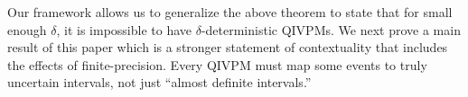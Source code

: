 \documentclass[english,reprint, aps, prl,superscriptaddress, showpacs,
showkeys, longbibliography, amsmath, amssymb, floatfix]{revtex4-1}
\theoremstyle{plain}
\theoremstyle{definition}
\newcommand{\events}{\ensuremath{\mathcal{E}}}
\newcommand{\proj}[1]{\op{#1}{#1}}
\newcommand{\yutsung}[1]{\begin{framed}\begin{minipage}{0.9\linewidth}\color{purple}{Yu-Tsung says: #1}\end{minipage}\end{framed}}
\newcommand{\andy}[1]{\fbox{\begin{minipage}{0.9\linewidth}\color{blue}{Andy says: #1}\end{minipage}}}
\begin{document}


Our framework allows us to generalize the above theorem to state that
for small enough $\delta$, it is impossible to have
$\delta$-deterministic QIVPMs. We next prove a main result of this
paper which is a stronger statement of contextuality that includes the
effects of finite-precision.  Every QIVPM must map some events to
truly uncertain intervals, not just ``almost definite intervals.'' 
\end{document}
